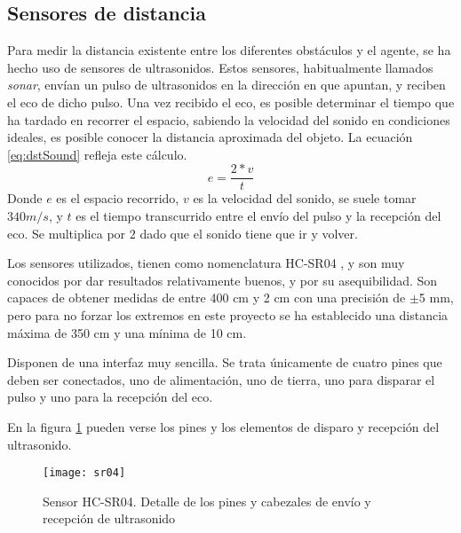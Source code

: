 \subsection{Sensores de distancia}
\label{subsec:hcsr04}
Para medir la distancia existente entre los diferentes obstáculos y el agente, se ha hecho uso de sensores de ultrasonidos. Estos sensores, habitualmente llamados \emph{sonar}, envían un pulso de ultrasonidos en la dirección en que apuntan, y reciben el eco de dicho pulso. Una vez recibido el eco, es posible determinar el tiempo que ha tardado en recorrer el espacio, sabiendo la velocidad del sonido en condiciones ideales, es posible conocer la distancia aproximada del objeto. 
La ecuación \ref{eq:dstSound} refleja este cálculo.
\begin{equation}
\label{eq:dstSound}
e = \frac{2*v}{t}
\end{equation}
Donde $e$ es el espacio recorrido, $v$ es la velocidad del sonido, se suele tomar $340m/s$, y $t$ es el tiempo transcurrido entre el envío del pulso y la recepción del eco. Se multiplica por $2$ dado que el sonido tiene que ir y volver.

Los sensores utilizados, tienen como nomenclatura HC-SR04 \citep{wiki:sparkHCsr04}, y son muy conocidos por dar resultados relativamente buenos, y por su asequibilidad. 
Son capaces de obtener medidas de entre 400 cm y 2 cm con una precisión de $\pm$5 mm, pero para no forzar los extremos en este proyecto se ha establecido una distancia máxima de 350 cm y una mínima de 10 cm. 

Disponen de una interfaz muy sencilla. Se trata únicamente de cuatro pines que deben ser conectados, uno de alimentación, uno de tierra, uno para disparar el pulso y uno para la recepción del eco. 

En la figura \ref{fig:sr04} pueden verse los pines y los elementos de disparo y recepción del ultrasonido. 

\begin{figure}[H]
	\centering
	\texttt{[image: sr04]}
	\caption[Sensor HC-SR04]{Sensor HC-SR04. Detalle de los pines y cabezales de envío y recepción de ultrasonido}\label{fig:sr04}
\end{figure}

